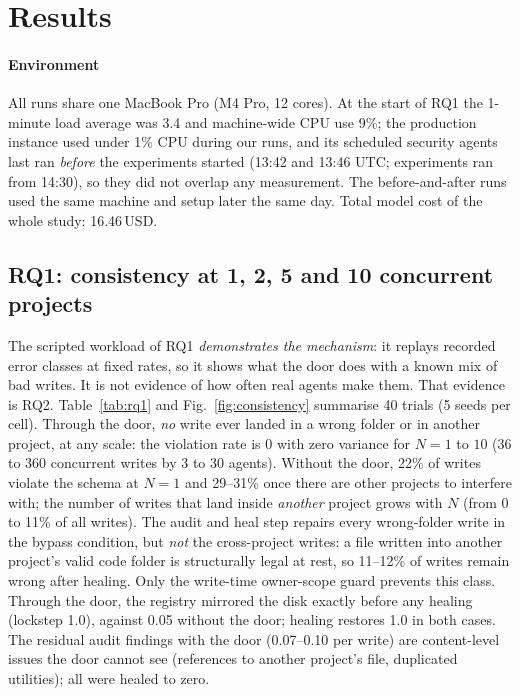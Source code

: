 \section{Results}\label{sec:results}
\paragraph*{Environment} All runs share one MacBook Pro (M4 Pro, 12 cores). At the start of RQ1 the 1-minute load average was 3.4 and machine-wide CPU use 9\%; the production instance used under 1\% CPU during our runs, and its scheduled security agents last ran \emph{before} the experiments started (13:42 and 13:46 UTC; experiments ran from 14:30), so they did not overlap any measurement. The before-and-after runs used the same machine and setup later the same day. Total model cost of the whole study: 16.46\,USD.

\subsection{RQ1: consistency at 1, 2, 5 and 10 concurrent projects}
The scripted workload of RQ1 \emph{demonstrates the mechanism}: it replays recorded error classes at fixed rates, so it shows what the door does with a known mix of bad writes. It is not evidence of how often real agents make them. That evidence is RQ2. Table~\ref{tab:rq1} and Fig.~\ref{fig:consistency} summarise 40 trials (5 seeds per cell). Through the door, \emph{no} write ever landed in a wrong folder or in another project, at any scale: the violation rate is 0 with zero variance for $N=1$ to $10$ (36 to 360 concurrent writes by 3 to 30 agents). Without the door, 22\% of writes violate the schema at $N=1$ and 29--31\% once there are other projects to interfere with; the number of writes that land inside \emph{another} project grows with $N$ (from 0 to 11\% of all writes). The audit and heal step repairs every wrong-folder write in the bypass condition, but \emph{not} the cross-project writes: a file written into another project's valid code folder is structurally legal at rest, so 11--12\% of writes remain wrong after healing. Only the write-time owner-scope guard prevents this class. Through the door, the registry mirrored the disk exactly before any healing (lockstep 1.0), against 0.05 without the door; healing restores 1.0 in both cases. The residual audit findings with the door (0.07--0.10 per write) are content-level issues the door cannot see (references to another project's file, duplicated utilities); all were healed to zero.

